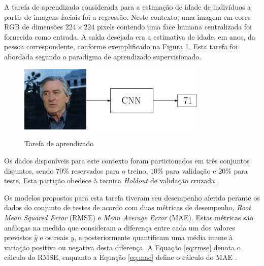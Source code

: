 A tarefa de aprendizado considerada para a estimação de idade de indivíduos a partir de imagens faciais foi a regressão. Neste contexto, uma imagem em cores RGB de dimensões $224 \times 224$ pixels contendo uma face humana centralizada foi fornecida como entrada. A saída desejada era a estimativa de idade, em anos, da pessoa correspondente, conforme exemplificado na Figura \ref{fig:deniro_cnn}. Esta tarefa foi abordada segundo o paradigma de aprendizado supervisionado.

\begin{figure}[!ht]
  \centering
     \caption{Tarefa de aprendizado}
     \includegraphics[width=0.8\textwidth]{img/deniro_cnn}
     \label{fig:deniro_cnn}
\end{figure}

Os dados disponíveis para este contexto foram particionados em três conjuntos disjuntos, sendo $70\%$ reservados para o treino, $10\%$ para validação e $20\%$ para teste. Esta partição obedece à tecnica \emph{Holdout} de validação cruzada \cite{brink2016real}.


Os modelos propostos para esta tarefa tiveram seu desempenho aferido perante os dados do conjunto de testes de acordo com duas métricas de desempenho, \emph{Root Mean Squared Error} (RMSE) e \emph{Mean Average Error} (MAE). Estas métricas são análogas na medida que consideram a diferença entre cada um dos valores previstos $\hat{y}$ e os reais $y$, e posteriormente quantificam uma média imune à variação positiva ou negativa desta diferença. A Equação \ref{eq:rmse} denota o cálculo do RMSE, enquanto a Equação \ref{eq:mae} define o cálculo do MAE \cite{willmott2005advantages}.

